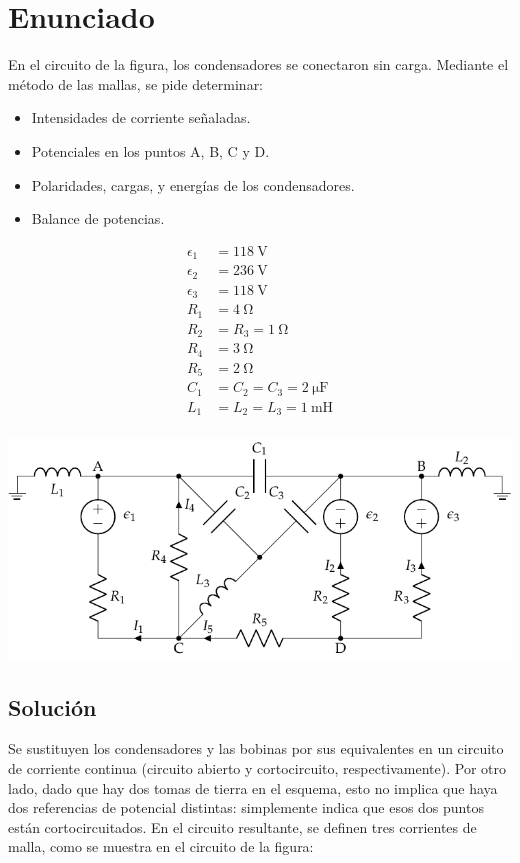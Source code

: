 \section{Enunciado}
En el circuito de la figura, los condensadores se conectaron sin
carga. Mediante el método de las mallas, se pide determinar:
\begin{itemize}
\item Intensidades de corriente señaladas.
\item Potenciales en los puntos A, B, C y D.
\item Polaridades, cargas, y energías de los condensadores.
\item Balance de potencias.
\end{itemize}
\begin{minipage}[c]{0.2\linewidth}
  \begin{align*}
    \epsilon_{1}&=\qty{118}{\volt}\\
    \epsilon_{2}&=\qty{236}{\volt}\\
    \epsilon_{3}&=\qty{118}{\volt}\\
    R_{1}&= \qty{4}{\ohm}\\
    R_{2}&=R_{3}=\qty{1}{\ohm}\\
    R_{4}&= \qty{3}{\ohm}\\
    R_{5}&= \qty{2}{\ohm}\\
    C_{1}&=C_{2}=C_{3}=\qty{2}{\micro\farad}\\
    L_1 &= L_2 = L_3 = \qty{1}{\milli\henry}\\
  \end{align*}
\end{minipage}
\begin{minipage}[c]{0.8\linewidth}
  \includegraphics{figuras/mallas_condensadores.pdf}
\end{minipage}

\subsection*{Solución}
Se sustituyen los condensadores y las bobinas por sus equivalentes en un circuito de corriente continua (circuito abierto y cortocircuito, respectivamente). Por otro lado, dado que hay dos tomas de tierra en el esquema, esto no implica que haya dos referencias de potencial distintas: simplemente indica que esos dos puntos están cortocircuitados. En el circuito resultante, se definen tres corrientes de malla, como se muestra en el circuito de la figura:

